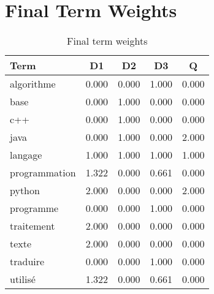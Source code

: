 \documentclass{article}
\begin{document}
\section{Final Term Weights}
\begin{table}[h]
\centering
\begin{tabular}{lcccc}
\toprule
Term & D1 & D2 & D3 & Q \\
\midrule
algorithme & 0.000 & 0.000 & 1.000 & 0.000 \\
base & 0.000 & 1.000 & 0.000 & 0.000 \\
c++ & 0.000 & 1.000 & 0.000 & 0.000 \\
java & 0.000 & 1.000 & 0.000 & 2.000 \\
langage & 1.000 & 1.000 & 1.000 & 1.000 \\
programmation & 1.322 & 0.000 & 0.661 & 0.000 \\
python & 2.000 & 0.000 & 0.000 & 2.000 \\
programme & 0.000 & 0.000 & 1.000 & 0.000 \\
traitement & 2.000 & 0.000 & 0.000 & 0.000 \\
texte & 2.000 & 0.000 & 0.000 & 0.000 \\
traduire & 0.000 & 0.000 & 1.000 & 0.000 \\
utilis\'{e} & 1.322 & 0.000 & 0.661 & 0.000 \\
\bottomrule
\end{tabular}
\caption{Final term weights}
\end{table}
\end{document}
